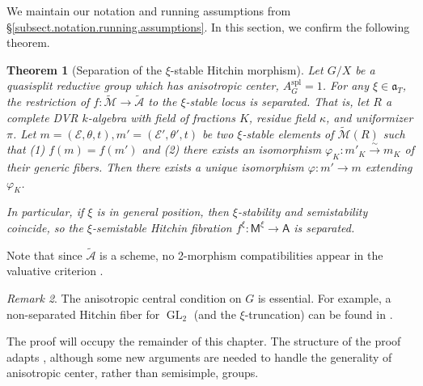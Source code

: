 \documentclass[openany]{amsbook}
\newtheorem{theorem}{Theorem}[chapter]
\theoremstyle{definition}
\theoremstyle{remark}
\newtheorem{remark}[theorem]{Remark}
\numberwithin{equation}{section}
\newcommand{\cA}{\mathcal{A}}
\newcommand{\cM}{\mathcal{M}}
\newcommand{\cE}{\mathcal{E}}
\renewcommand{\phi}{\varphi}
\renewcommand{\-}{\operatorname{-}}
\newcommand{\GL}{\operatorname{GL}}
\renewcommand{\a}{\mathfrak{a}}
\newcommand{\ctM}{\widetilde{\cM}}
\newcommand{\ctA}{\widetilde{\cA}}
\newcommand{\bM}{\mathsf{M}}
\newcommand{\bA}{\mathsf{A}}
\newcommand{\spl}{\mathrm{spl}}
\begin{document}
\newcommand{\rel}{\mathrm{rel}}

We maintain our notation and running assumptions from \S \ref{subsect.notation.running.assumptions}. In this section, we confirm the following theorem.

\begin{theorem}[Separation of the $\xi$-stable Hitchin morphism] \label{thm.sep}
    Let $G/X$ be a quasisplit reductive group which has anisotropic center, $A_G^{\spl} = 1$. For any $\xi \in \a_T$, the restriction of $f : \ctM \to \ctA$ to the $\xi$-stable locus is separated. That is, let $R$ a complete DVR $k$-algebra with field of fractions $K$, residue field $\kappa$, and uniformizer $\pi$. Let $m = (\cE, \theta, t), m' = (\cE', \theta', t)$ be two $\xi$-stable elements of $\ctM(R)$ such that (1) $f(m) = f(m')$ and (2) there exists an isomorphism $\phi_K : m'_K \xrightarrow{\sim} m_K$ of their generic fibers. Then there exists a \textit{unique} isomorphism $\phi : m' \to m$ extending $\phi_K$.

    In particular, if $\xi$ is in general position, then $\xi$-stability and semistability coincide, so the $\xi$-semistable Hitchin fibration $f^\xi : \bM^{\xi} \to \bA$ is separated.  
\end{theorem}

Note that since $\ctA$ is a scheme, no 2-morphism compatibilities appear in the valuative criterion \cite[Tag. 0CLD]{stacks-project}. 

\begin{remark} The anisotropic central condition on $G$ is essential. For example, a non-separated Hitchin fiber for $\GL_2$ (and the $\xi$-truncation) can be found in \cite[\S 5,6]{CGeoofFL}.
\end{remark}

The proof will occupy the remainder of this chapter. The structure of the proof adapts \cite[\S 9]{CLI}, although some new arguments are needed to handle the generality of anisotropic center, rather than semisimple, groups.
\end{document}
